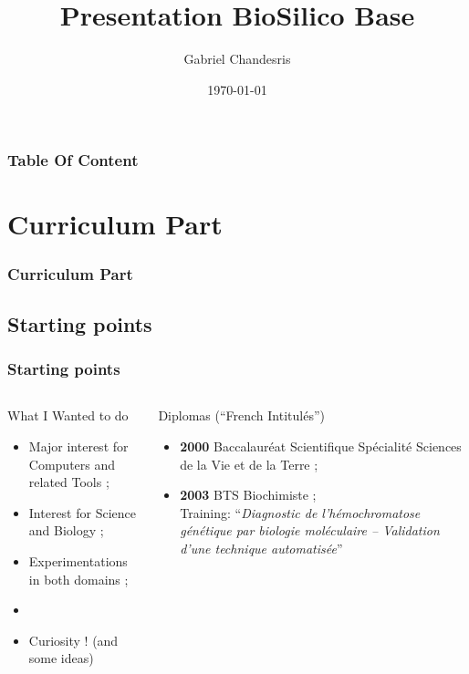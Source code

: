 \documentclass{beamer}
\title[Presentation BioSilico Base]{Presentation BioSilico Base}
\author{Gabriel Chandesris}
\institute{ \texttt{[image: ../img/logo\_glider.png]} }
\date{\today } %
\begin{document}
\begin{frame}
	\titlepage
\end{frame}

\begin{frame}
	\frametitle{Table Of Content}
	\small \tableofcontents[hideallsubsections]
\end{frame} 

\def\titleSectionCurriculumPart{Curriculum Part}
\section{\titleSectionCurriculumPart }
\begin{frame}
	\frametitle{\titleSectionCurriculumPart }
	\tableofcontents[sections=1,currentsection,subsectionstyle=show/shaded/hide]
\end{frame} 

\def\titleSubSectionCurriculumPartOne{Starting points}
\subsection{ \titleSubSectionCurriculumPartOne }
\begin{frame}
	\frametitle{ \titleSubSectionCurriculumPartOne }
	\begin{columns}[T]
	\begin{column}[T]{6.0cm}
		\begin{block}{What I Wanted to do}
			\begin{itemize}
				\item Major interest for Computers and related Tools ; 
				\item Interest for Science and Biology ; 
				\item Experimentations in both domains ; 
				\item[] 
				\item Curiosity ! (and some ideas)
			\end{itemize}
		\end{block}
	\end{column}
	\begin{column}[T]{5.0cm}
		\begin{block}{Diplomas (``French Intitul{\'e}s'') }
			\begin{itemize}
				\item \textbf{2000} Baccalaur{\'e}at Scientifique Sp{\'e}cialit{\'e} Sciences de la Vie et de la Terre ; 
				\item \textbf{2003} BTS Biochimiste ; ~\\
				Training: ``\emph{Diagnostic de l'h{\'e}mochromatose g{\'e}n{\'e}tique par biologie mol{\'e}culaire -- Validation d'une technique automatis{\'e}e}''
			\end{itemize}
		\end{block}
	\end{column}
	\end{columns}
\end{frame} 
\end{document}
